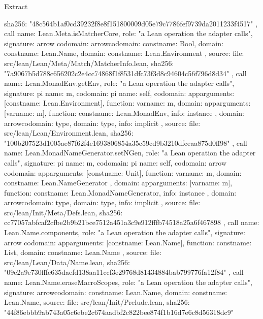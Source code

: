 \begin{lexlean}{Extract}
\begin{toolingmodule}
{{{        sha256: "48c564b1af0cd39232f8e8f151800009d05e79c7786fef9739da2011233f4517"
      }
    },
    call{
      name: Lean.Meta.isMatcherCore,
      role: "a Lean operation the adapter calls",
      signature: arrow{
        codomain: arrow{codomain: const{name: Bool}, domain: const{name: Lean.Name}},
        domain: const{name: Lean.Environment}
      },
      source: {
        file: src/lean/Lean/Meta/Match/MatcherInfo.lean,
        sha256: "7a9067b5d788c656202c2e4cc74868f1f8531dfc73f3d8c94604c56f796d8d34"
      }
    },
    call{
      name: Lean.MonadEnv.getEnv,
      role: "a Lean operation the adapter calls",
      signature: pi{
        name: m,
        codomain: pi{
          name: self,
          codomain: app{arguments: [const{name: Lean.Environment}], function: var{name: m}},
          domain: app{arguments: [var{name: m}], function: const{name: Lean.MonadEnv}},
          info: instance
        },
        domain: arrow{codomain: type{}, domain: type{}},
        info: implicit
      },
      source: {
        file: src/lean/Lean/Environment.lean,
        sha256: "100b207523d1005ae87f62f4e1693806854a35c59cd9b3210dfeeaa875d0ff98"
      }
    },
    call{
      name: Lean.MonadNameGenerator.setNGen,
      role: "a Lean operation the adapter calls",
      signature: pi{
        name: m,
        codomain: pi{
          name: self,
          codomain: arrow{
            codomain: app{arguments: [const{name: Unit}], function: var{name: m}},
            domain: const{name: Lean.NameGenerator}
          },
          domain: app{arguments: [var{name: m}], function: const{name: Lean.MonadNameGenerator}},
          info: instance
        },
        domain: arrow{codomain: type{}, domain: type{}},
        info: implicit
      },
      source: {
        file: src/lean/Init/Meta/Defs.lean,
        sha256: cc77057abfcaf2cfbe2b9b21bce7512a451a3c9e912fffb74518a25a6f467898
      }
    },
    call{
      name: Lean.Name.components,
      role: "a Lean operation the adapter calls",
      signature: arrow{
        codomain: app{arguments: [const{name: Lean.Name}], function: const{name: List}},
        domain: const{name: Lean.Name}
      },
      source: {
        file: src/lean/Lean/Data/Name.lean,
        sha256: "09e2a9e730fffe635daefd138aa11ccf3e29768d81434884bab799776fa12f84"
      }
    },
    call{
      name: Lean.Name.eraseMacroScopes,
      role: "a Lean operation the adapter calls",
      signature: arrow{codomain: const{name: Lean.Name}, domain: const{name: Lean.Name}},
      source: {
        file: src/lean/Init/Prelude.lean,
        sha256: "44f86ebbb9ab743a05c6ebe2c674aadbf2c822bee874f1b16d7e6c8d56318dc9"
}}}
\end{toolingmodule}
\end{lexlean}
